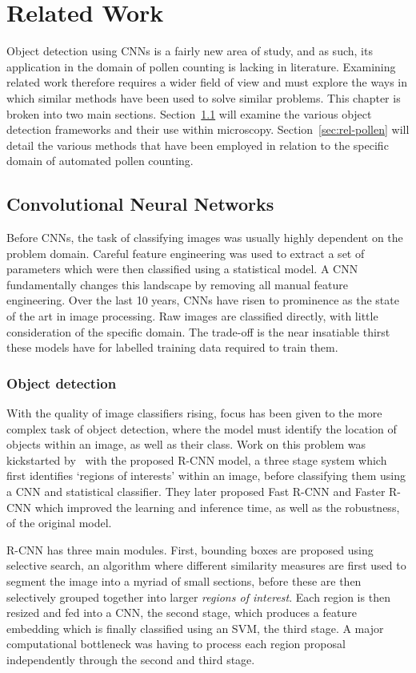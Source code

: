 \chapter{Related Work}\label{cha:related}
Object detection using CNNs is a fairly new area of study, and as such, its application in the domain of pollen counting is lacking in literature.
Examining related work therefore requires a wider field of view and must explore the ways in which similar methods have been used to solve similar problems.
This chapter is broken into two main sections.
Section~\ref{sec:rel-cnn} will examine the various object detection frameworks and their use within microscopy.
Section~\ref{sec:rel-pollen} will detail the various methods that have been employed in relation to the specific domain of automated pollen counting.

\section{Convolutional Neural Networks}\label{sec:rel-cnn}
Before CNNs, the task of classifying images was usually highly dependent on the problem domain.
Careful feature engineering was used to extract a set of parameters which were then classified using a statistical model.
A CNN fundamentally changes this landscape by removing all manual feature engineering.
Over the last 10 years, CNNs have risen to prominence as the state of the art in image processing.
Raw images are classified directly, with little consideration of the specific domain.
The trade-off is the near insatiable thirst these models have for labelled training data required to train them.

\subsection{Object detection}
With the quality of image classifiers rising, focus has been given to the more complex task of object detection, where the model must identify the location of objects within an image, as well as their class.
Work on this problem was kickstarted by\ \textcite{girshick_rich_2014} with the proposed R-CNN model, a three stage system which first identifies `regions of interests' within an image, before classifying them using a CNN and statistical classifier.
They later proposed Fast R-CNN and Faster R-CNN which improved the learning and inference time, as well as the robustness, of the original model.

R-CNN has three main modules.
First, bounding boxes are proposed using selective search, an algorithm where different similarity measures are first used to segment the image into a myriad of small sections, before these are then selectively grouped together into larger \textit{regions of interest}.
Each region is then resized and fed into a CNN, the second stage, which produces a feature embedding which is finally classified using an SVM, the third stage.
A major computational bottleneck was having to process each region proposal independently through the second and third stage.

